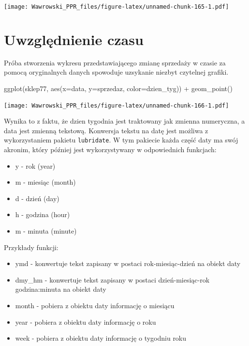 \documentclass[
]{book}
\newenvironment{Shaded}{\begin{snugshade}}{\end{snugshade}}
\newcommand{\AttributeTok}[1]{\textcolor[rgb]{0.77,0.63,0.00}{#1}}
\newcommand{\FunctionTok}[1]{\textcolor[rgb]{0.00,0.00,0.00}{#1}}
\newcommand{\NormalTok}[1]{#1}
\newcommand{\SpecialCharTok}[1]{\textcolor[rgb]{0.00,0.00,0.00}{#1}}
\providecommand{\tightlist}{%
  \setlength{\itemsep}{0pt}\setlength{\parskip}{0pt}}
\begin{document}
\texttt{[image: Wawrowski\_PPR\_files/figure-latex/unnamed-chunk-165-1.pdf]}

\hypertarget{uwzglux119dnienie-czasu}{%
\section{Uwzględnienie czasu}\label{uwzglux119dnienie-czasu}}

Próba stworzenia wykresu przedstawiającego zmianę sprzedaży w czasie za pomocą oryginalnych danych spowoduje uzsykanie niezbyt czytelnej grafiki.

\begin{Shaded}
\begin{Highlighting}[]
\FunctionTok{ggplot}\NormalTok{(sklep77, }\FunctionTok{aes}\NormalTok{(}\AttributeTok{x=}\NormalTok{data,}
                    \AttributeTok{y=}\NormalTok{sprzedaz,}
                    \AttributeTok{color=}\NormalTok{dzien\_tyg)) }\SpecialCharTok{+}
  \FunctionTok{geom\_point}\NormalTok{()}
\end{Highlighting}
\end{Shaded}

\texttt{[image: Wawrowski\_PPR\_files/figure-latex/unnamed-chunk-166-1.pdf]}

Wynika to z faktu, że dzien tygodnia jest traktowany jak zmienna numeryczna, a data jest zmienną tekstową. Konwersja tekstu na datę jest możliwa z wykorzystaniem pakietu \texttt{lubridate}. W tym pakiecie każda część daty ma swój akronim, który później jest wykorzystywany w odpowiednich funkcjach:

\begin{itemize}
\tightlist
\item
  y - rok (year)
\item
  m - miesiąc (month)
\item
  d - dzień (day)
\item
  h - godzina (hour)
\item
  m - minuta (minute)
\end{itemize}

Przykłady funkcji:

\begin{itemize}
\tightlist
\item
  ymd - konwertuje tekst zapisany w postaci rok-miesiąc-dzień na obiekt daty
\item
  dmy\_hm - konwertuje tekst zapisany w postaci dzień-miesiąc-rok godzina:minuta na obiekt daty
\item
  month - pobiera z obiektu daty informację o miesiącu
\item
  year - pobiera z obiektu daty informację o roku
\item
  week - pobiera z obiektu daty informację o tygodniu roku
\end{itemize}
\end{document}
